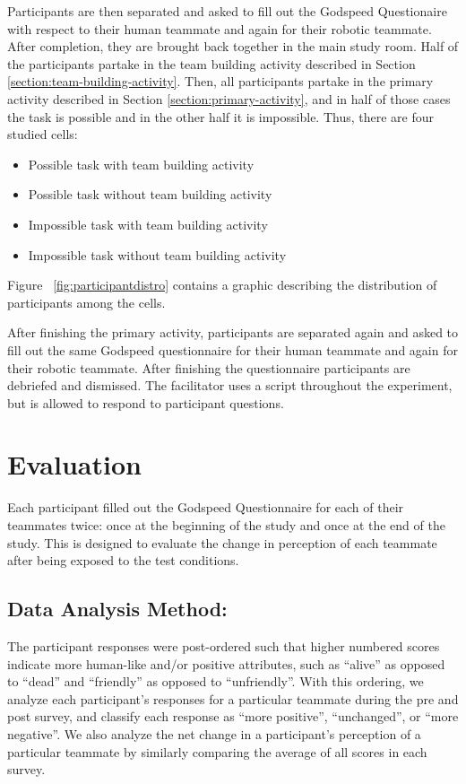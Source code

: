 \documentclass{acm_proc_article-sp}
\begin{document}
Participants are then separated and asked to fill out the Godspeed Questionaire \cite{Godspeed} with respect to their human teammate and again for their robotic teammate. After completion, they are brought back together in the main study room.
Half of the participants partake in the team building activity described in Section \ref{section:team-building-activity}. Then, all participants partake in the primary activity described in Section \ref{section:primary-activity}, and in half of those cases the task is possible and in the other half it is impossible. Thus, there are four studied cells:
\begin{itemize}
 \item Possible task with team building activity
 \item Possible task without team building activity
 \item Impossible task with team building activity
 \item Impossible task without team building activity
\end{itemize}

Figure ~\ref{fig:participantdistro} contains a graphic describing the distribution of participants among the cells. 

After finishing the primary activity, participants are separated again and asked to fill out the same Godspeed questionnaire for their human teammate and again for their robotic teammate. After finishing the questionnaire participants are debriefed and dismissed. The facilitator uses a script throughout the experiment, but is allowed to respond to participant questions. 

\section{Evaluation}
\label{section:objective-evaluation}
Each participant filled out the Godspeed Questionnaire for each of their teammates twice: once at the beginning of the study and once at the end of the study. This is designed to evaluate the change in perception of each teammate after being exposed to the test conditions.
\subsection{Data Analysis Method:}
The participant responses were post-ordered such that higher numbered scores indicate more human-like and/or positive attributes, such as ``alive'' as opposed to ``dead'' and ``friendly'' as opposed to ``unfriendly''. With this ordering, we analyze each participant's responses for a particular teammate during the pre and post survey, and classify each response as ``more positive'', ``unchanged'', or ``more negative''. We also analyze the net change in a participant's perception of a particular teammate by similarly comparing the average of all scores in each survey.
\end{document}
